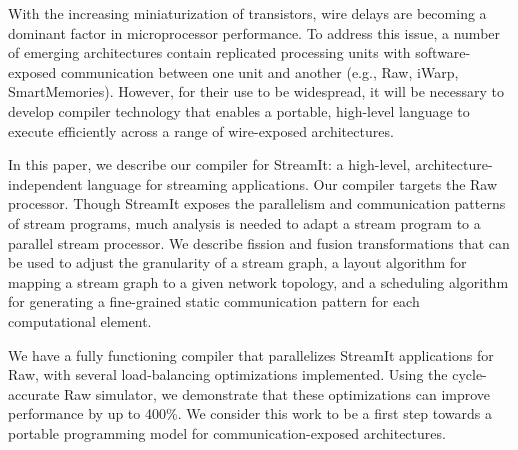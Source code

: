 With the increasing miniaturization of transistors, wire delays are
becoming a dominant factor in microprocessor performance.  To address
this issue, a number of emerging architectures contain replicated
processing units with software-exposed communication between one unit
and another (e.g., Raw, iWarp, SmartMemories).  However, for
their use to be widespread, it will be necessary to develop compiler
technology that enables a portable, high-level language to execute
efficiently across a range of wire-exposed architectures.

In this paper, we describe our compiler for StreamIt: a high-level,
architecture-independent language for streaming applications.  Our
compiler targets the Raw processor.  Though StreamIt exposes the
parallelism and communication patterns of stream programs, much
analysis is needed to adapt a stream program to a parallel stream
processor.  We describe fission and fusion transformations that can be
used to adjust the granularity of a stream graph, a layout algorithm
for mapping a stream graph to a given network topology, and a
scheduling algorithm for generating a fine-grained static
communication pattern for each computational element.

We have a fully functioning compiler that parallelizes StreamIt
applications for Raw, with several load-balancing optimizations
implemented.  Using the cycle-accurate Raw simulator, we demonstrate
that these optimizations can improve performance by up to 400\%.  We
consider this work to be a first step towards a portable programming
model for communication-exposed architectures.

